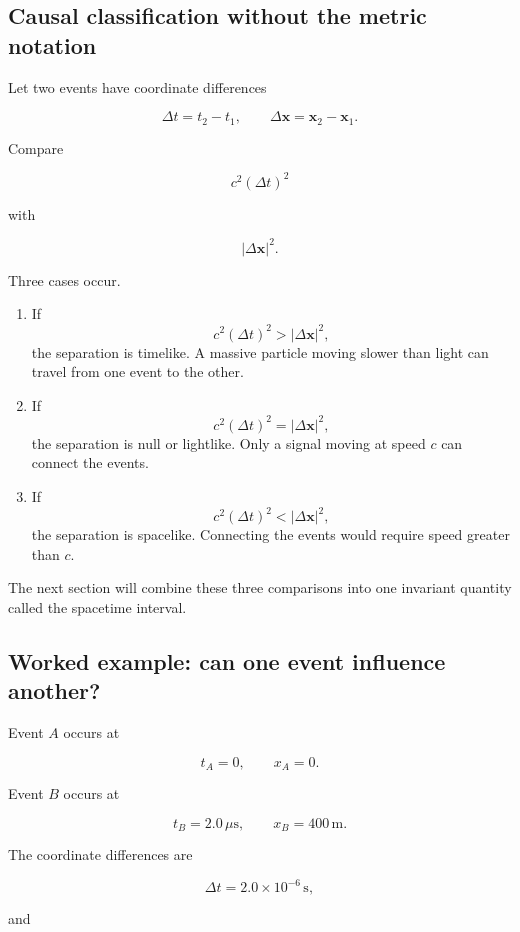 \subsection{Causal classification without the metric notation}

Let two events have coordinate differences

\[
\Delta t=t_{2}-t_{1},
\qquad
\Delta\mathbf{x}=\mathbf{x}_{2}-\mathbf{x}_{1}.
\]

Compare

\[
c^{2}(\Delta t)^{2}
\]

with

\[
|\Delta\mathbf{x}|^{2}.
\]

Three cases occur.

\begin{enumerate}
    \item If
    \[
    c^{2}(\Delta t)^{2}
    >
    |\Delta\mathbf{x}|^{2},
    \]
    the separation is timelike. A massive particle moving slower than light can travel from one event to the other.

    \item If
    \[
    c^{2}(\Delta t)^{2}
    =
    |\Delta\mathbf{x}|^{2},
    \]
    the separation is null or lightlike. Only a signal moving at speed \(c\) can connect the events.

    \item If
    \[
    c^{2}(\Delta t)^{2}
    <
    |\Delta\mathbf{x}|^{2},
    \]
    the separation is spacelike. Connecting the events would require speed greater than \(c\).
\end{enumerate}

The next section will combine these three comparisons into one invariant quantity called the spacetime interval.

\subsection{Worked example: can one event influence another?}

Event \(A\) occurs at

\[
t_{A}=0,
\qquad
x_{A}=0.
\]

Event \(B\) occurs at

\[
t_{B}=2.0\,\mu\mathrm{s},
\qquad
x_{B}=400\,\mathrm{m}.
\]

The coordinate differences are

\[
\Delta t=2.0\times10^{-6}\,\mathrm{s},
\]

and

